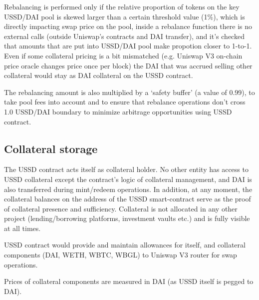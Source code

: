 Rebalancing is performed only if the relative proportion of tokens on the key USSD/DAI pool is
skewed larger than a certain threshold value (1\%), which is directly impacting swap price on
the pool, inside a rebalance function there is no external calls (outside Uniswap's contracts
and DAI transfer), and it's checked that amounts that are put into USSD/DAI pool make propotion
closer to 1-to-1. Even if some collateral pricing is a bit mismatched (e.g. Uniswap V3 on-chain
price oracle changes price once per block) the DAI that was accrued selling other collateral
would stay as DAI collateral on the USSD contract.

The rebalancing amount is also multiplied by a `safety buffer' (a value of 0.99), to take pool
fees into account and to ensure that rebalance operations don't cross 1.0 USSD/DAI boundary
to minimize arbitrage opportunities using USSD contract.

\subsection{Collateral storage}

The USSD contract acts itself as collateral holder. No other entity has access to USSD 
collateral except the contract's logic of collateral management, and DAI is also 
transferred during mint/redeem operations. In addition, at any moment, the collateral 
balances on the address of the USSD smart-contract serve as the proof of collateral 
presence and sufficiency. Collateral is not allocated in any other project 
(lending/borrowing platforms, investment vaults etc.) and is fully visible at all times.

USSD contract would provide and maintain allowances for itself, and collateral components
(DAI, WETH, WBTC, WBGL) to Uniswap V3 router for swap operations.

Prices of collateral components are measured in DAI (as USSD itself is pegged to DAI).

